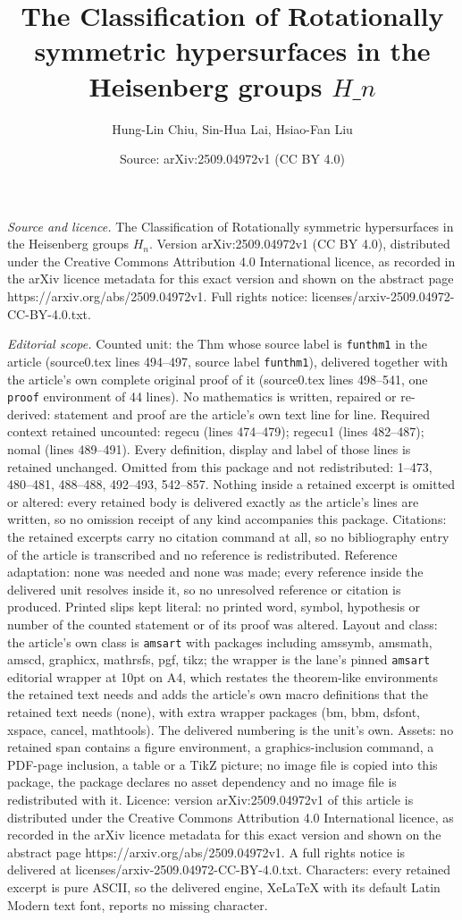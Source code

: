 \documentclass[10pt,a4paper]{amsart}
\title[The Classification of Rotationally symmetric hypersurfaces i]{The Classification of Rotationally symmetric hypersurfaces in the Heisenberg groups $H\_{n}$}
\author{Hung-Lin Chiu, Sin-Hua Lai, Hsiao-Fan Liu}
\date{Source: arXiv:2509.04972v1 (CC BY 4.0)}
\begin{document}
\maketitle

\noindent\emph{Source and licence.} The Classification of Rotationally symmetric hypersurfaces in the Heisenberg groups $H_{n}$. Version arXiv:2509.04972v1 (CC BY 4.0), distributed under the Creative Commons Attribution 4.0 International licence, as recorded in the arXiv licence metadata for this exact version and shown on the abstract page https://arxiv.org/abs/2509.04972v1. Full rights notice: licenses/arxiv-2509.04972-CC-BY-4.0.txt.\par\smallskip

\noindent\textit{Editorial scope.} Counted unit: the Thm whose source label is \texttt{funthm1} in the article (source0.tex lines 494--497, source label \texttt{funthm1}), delivered together with the article's own complete original proof of it (source0.tex lines 498--541, one \texttt{proof} environment of 44 lines). No mathematics is written, repaired or re-derived: statement and proof are the article's own text line for line. Required context retained uncounted: regecu (lines 474--479); regecu1 (lines 482--487); nomal (lines 489--491). Every definition, display and label of those lines is retained unchanged. Omitted from this package and not redistributed: 1--473, 480--481, 488--488, 492--493, 542--857. Nothing inside a retained excerpt is omitted or altered: every retained body is delivered exactly as the article's lines are written, so no omission receipt of any kind accompanies this package. Citations: the retained excerpts carry no citation command at all, so no bibliography entry of the article is transcribed and no reference is redistributed. Reference adaptation: none was needed and none was made; every reference inside the delivered unit resolves inside it, so no unresolved reference or citation is produced. Printed slips kept literal: no printed word, symbol, hypothesis or number of the counted statement or of its proof was altered. Layout and class: the article's own class is \texttt{amsart} with packages including amssymb, amsmath, amscd, graphicx, mathrsfs, pgf, tikz; the wrapper is the lane's pinned \texttt{amsart} editorial wrapper at 10pt on A4, which restates the theorem-like environments the retained text needs and adds the article's own macro definitions that the retained text needs (none), with extra wrapper packages (bm, bbm, dsfont, xspace, cancel, mathtools). The delivered numbering is the unit's own. Assets: no retained span contains a figure environment, a graphics-inclusion command, a PDF-page inclusion, a table or a TikZ picture; no image file is copied into this package, the package declares no asset dependency and no image file is redistributed with it. Licence: version arXiv:2509.04972v1 of this article is distributed under the Creative Commons Attribution 4.0 International licence, as recorded in the arXiv licence metadata for this exact version and shown on the abstract page https://arxiv.org/abs/2509.04972v1. A full rights notice is delivered at licenses/arxiv-2509.04972-CC-BY-4.0.txt. Characters: every retained excerpt is pure ASCII, so the delivered engine, XeLaTeX with its default Latin Modern text font, reports no missing character.
\end{document}

